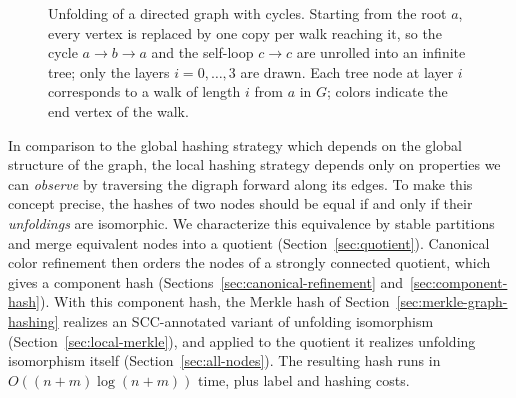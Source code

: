 \documentclass[twoside,leqno]{article}
\newcommand{\Unf}{\mathcal{T}}
\begin{document}
\begin{figure}[!t]
\caption{Unfolding of a directed graph with cycles. Starting from the root
$a$, every vertex is replaced by one copy per walk reaching it, so the cycle
$a\to b\to a$ and the self-loop $c\to c$ are unrolled into an infinite tree;
only the layers $i=0,\dots,3$ are drawn. Each tree node at layer $i$
corresponds to a walk of length $i$ from $a$ in $G$; colors indicate the
end vertex of the walk.}
\label{fig:unfolding}
\end{figure}

In comparison to the global hashing strategy which depends on the global structure of the graph, the local hashing strategy depends only on properties we can \textit{observe} by traversing the digraph forward along its edges. To make this concept precise, the hashes of two nodes should be equal if and only if their \textit{unfoldings} are isomorphic. We characterize this equivalence by stable partitions and merge equivalent nodes into a quotient (Section~\ref{sec:quotient}). Canonical color refinement \cite{berkholz2017tight} then orders the nodes of a strongly connected quotient, which gives a component hash (Sections~\ref{sec:canonical-refinement} and~\ref{sec:component-hash}). With this component hash, the Merkle hash of Section~\ref{sec:merkle-graph-hashing} realizes an SCC-annotated variant of unfolding isomorphism (Section~\ref{sec:local-merkle}), and applied to the quotient it realizes unfolding isomorphism itself (Section~\ref{sec:all-nodes}). The resulting hash runs in $O((n+m)\log(n+m))$ time, plus label and hashing costs.
\end{document}
